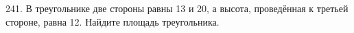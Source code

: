 241. В треугольнике две стороны равны 13 и 20, а высота, проведённая к третьей стороне, равна 12. Найдите площадь треугольника.\\
